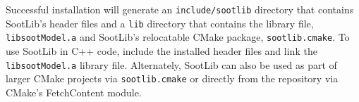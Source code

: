 \documentclass[preprint,letterpaper]{elsarticle}
\begin{document}
Successful installation will generate an \texttt{include/sootlib} directory that contains SootLib's header files and a \texttt{lib} directory that contains the library file, \texttt{libsootModel.a} and SootLib's relocatable CMake package, \texttt{sootlib.cmake}.
To use SootLib in C++ code, include the installed header files and link the \texttt{libsootModel.a} library file. Alternately, SootLib can also be used as part of larger CMake projects via \texttt{sootlib.cmake} or directly from the repository via CMake's FetchContent module.
\end{document}
